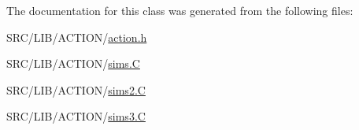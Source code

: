 The documentation for this class was generated from the following files\+:\begin{DoxyCompactItemize}
\item 
S\+R\+C/\+L\+I\+B/\+A\+C\+T\+I\+O\+N/\mbox{\hyperlink{action_8h}{action.\+h}}\item 
S\+R\+C/\+L\+I\+B/\+A\+C\+T\+I\+O\+N/\mbox{\hyperlink{sims_8_c}{sims.\+C}}\item 
S\+R\+C/\+L\+I\+B/\+A\+C\+T\+I\+O\+N/\mbox{\hyperlink{sims2_8_c}{sims2.\+C}}\item 
S\+R\+C/\+L\+I\+B/\+A\+C\+T\+I\+O\+N/\mbox{\hyperlink{sims3_8_c}{sims3.\+C}}\end{DoxyCompactItemize}
